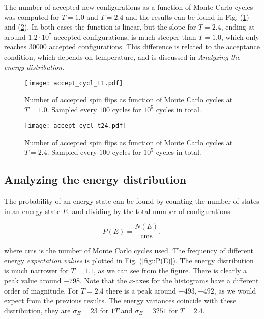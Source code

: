 \documentclass[11pt]{article}
\begin{document}
\begin{flushleft}
The number of accepted new configurations as a function of Monte Carlo cycles was computed for $T=1.0$ and $T=2.4$ and the results can be found in Fig. (\ref{fig::no accept 1}) and (\ref{fig::no accept 2.4}). In both cases the function is linear, but the slope for $T=2.4$, ending at around $1.2 \cdot 10^7$ accepted configurations, is much steeper than $T=1.0$, which only reaches $30000$ accepted configurations. This difference is related to the acceptance condition, which depends on temperature, and is discussed in \textit{Analyzing the energy distribution}.


\begin{figure}[H]
\centering
\texttt{[image: accept\_cycl\_t1.pdf]}
\caption{Number of accepted spin flips as function of Monte Carlo cycles at $T=1.0$. Sampled every $100$ cycles for $10^5$ cycles in total.}
\label{fig::no accept 1}
\end{figure}

\begin{figure}[H]
\centering
\texttt{[image: accept\_cycl\_t24.pdf]}
\caption{Number of accepted spin flips as function of Monte Carlo cycles at $T=2.4$. Sampled every $100$ cycles for $10^5$ cycles in total.}
\label{fig::no accept 2.4}
\end{figure}

\end{flushleft}


\subsection*{Analyzing the energy distribution}



\begin{flushleft}
The probability of an energy state can be found by counting the number of states in an energy state $E$, and dividing by the total number of configurations

\begin{equation}
P(E) = \frac{N(E)}{\mathrm{cms}},
\end{equation}

where cms is the number of Monte Carlo cycles used. The frequency of different energy \textit{expectation values} is plotted in  Fig. (\ref{fig::P(E)}). The energy distribution is much narrower for $T=1.1$, as we can see from the figure. There is clearly a peak value around $-798$. Note that the $x$-axes for the histograms have a different order of magnitude. For $T=2.4$ there is a peak around $-493,-492$, as we would expect from the previous results. The energy variances coincide with these distribution, they are $ \sigma_E = 23$ for $1T$ and $\sigma_E = 3251$ for $T=2.4$.

\end{flushleft}
\end{document}
